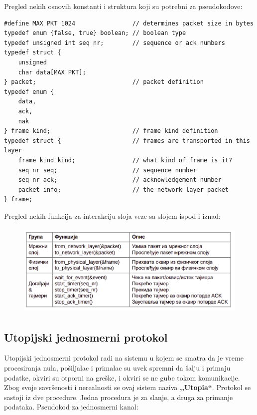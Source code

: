 \documentclass[a4paper]{article}
\begin{document}
    Pregled nekih osnovih konstanti i struktura koji su potrebni za pseudokodove:
    \begin{lstlisting}
#define MAX PKT 1024                // determines packet size in bytes 
typedef enum {false, true} boolean; // boolean type 
typedef unsigned int seq nr;        // sequence or ack numbers 
typedef struct {
    unsigned 
    char data[MAX PKT];
} packet;                           // packet definition 
typedef enum {
    data, 
    ack, 
    nak
} frame kind;                       // frame kind definition 
typedef struct {                    // frames are transported in this layer 
    frame kind kind;                // what kind of frame is it? 
    seq nr seq;                     // sequence number 
    seq nr ack;                     // acknowledgement number 
    packet info;                    // the network layer packet 
} frame;\end{lstlisting}
    Pregled nekih funkcija za interakciju sloja veze sa slojem ispod i iznad:
    \begin{figure}[H]
        \begin{center}
            \includegraphics[width=120mm,height=45mm]{Slike/sloj_veze_funkcije.png}
        \end{center}
    \end{figure} 
    
    \newpage
    \subsection{Utopijski jednosmerni protokol}
        Utopijski jednosmerni protokol radi na sistemu u kojem se smatra da je vreme procesiranja nula,
        pošiljalac i primalac su uvek spremni da šalju i primaju podatke, okviri su otporni na greške,
        i okviri se ne gube tokom komunikacije. Zbog svoje savršenosti i nerealnosti se ovaj sistem naziva
        \textbf{,,Utopia``}. Protokol se sastoji iz dve procedure. Jedna procedura je za slanje, a druga
        za primanje podataka. Pseudokod za jednosmerni kanal:
  
\end{document}
